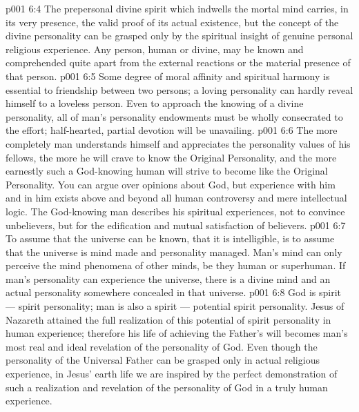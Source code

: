 \vs p001 6:4 \pc The prepersonal divine spirit which indwells the mortal mind carries, in its very presence, the valid proof of its actual existence, but the concept of the divine personality can be grasped only by the spiritual insight of genuine personal religious experience. Any person, human or divine, may be known and comprehended quite apart from the external reactions or the material presence of that person.
\vs p001 6:5 Some degree of moral affinity and spiritual harmony is essential to friendship between two persons; a loving personality can hardly reveal himself to a loveless person. Even to approach the knowing of a divine personality, all of man’s personality endowments must be wholly consecrated to the effort; half\hyp{}hearted, partial devotion will be unavailing.
\vs p001 6:6 The more completely man understands himself and appreciates the personality values of his fellows, the more he will crave to know the Original Personality, and the more earnestly such a God\hyp{}knowing human will strive to become like the Original Personality. You can argue over opinions about God, but experience with him and in him exists above and beyond all human controversy and mere intellectual logic. The God\hyp{}knowing man describes his spiritual experiences, not to convince unbelievers, but for the edification and mutual satisfaction of believers.
\vs p001 6:7 \pc To assume that the universe can be known, that it is intelligible, is to assume that the universe is mind made and personality managed. Man’s mind can only perceive the mind phenomena of other minds, be they human or superhuman. If man’s personality can experience the universe, there is a divine mind and an actual personality somewhere concealed in that universe.
\vs p001 6:8 \pc God is spirit --- spirit personality; man is also a spirit --- potential spirit personality. Jesus of Nazareth attained the full realization of this potential of spirit personality in human experience; therefore his life of achieving the Father’s will becomes man’s most real and ideal revelation of the personality of God. Even though the personality of the Universal Father can be grasped only in actual religious experience, in Jesus’ earth life we are inspired by the perfect demonstration of such a realization and revelation of the personality of God in a truly human experience.
